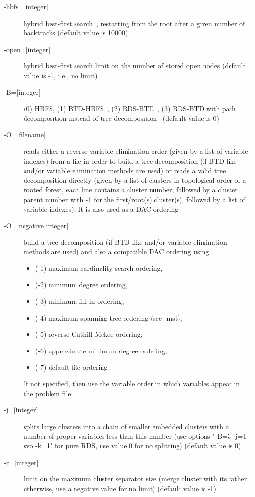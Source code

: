\documentclass{article}
\begin{document}
\begin{description}
\item[{-hbfs=[integer]}] hybrid best-first search~\cite{Katsirelos15a}, restarting from the
  root after a given number of backtracks (default value is 10000)
\item[{-open=[integer]}] hybrid best-first search limit on the number
  of stored open nodes (default value is -1, i.e., no limit)
\item[{-B=[integer]}] (0) HBFS, (1) BTD-HBFS~\cite{Schiex06a,Katsirelos15a}, (2) RDS-BTD~\cite{Sanchez09a}, (3) RDS-BTD with
  path decomposition instead of tree decomposition~\cite{Sanchez09a} (default value is
  0)
\item[{-O=[filename]}] reads either a reverse variable elimination order (given by a list of variable indexes) from a file
  in order to build a tree decomposition (if BTD-like and/or variable
  elimination methods are used) or reads a valid tree decomposition directly (given by a list of clusters in topological order of a rooted forest, each line contains a cluster number, followed by a cluster parent number with -1 for the first/root(s) cluster(s), followed by a list of variable indexes). It is also used as a DAC ordering.
\item[{-O=[negative integer]}] build a tree decomposition (if BTD-like
  and/or variable elimination methods are used) and also a compatible
  DAC ordering using
  \begin{itemize}
    \item (-1) maximum cardinality search ordering, 
    \item (-2) minimum degree ordering, 
    \item (-3) minimum fill-in ordering,
    \item (-4) maximum spanning tree ordering (see -mst), 
    \item (-5) reverse Cuthill-Mckee ordering, 
    \item (-6) approximate minimum degree ordering,
    \item (-7) default file ordering
    \end{itemize}
    If not specified, then use the variable order in which variables appear in the problem file.
\item[{-j=[integer]}] splits large clusters into a chain of smaller embedded clusters with a number of proper variables less than this number (use options "-B=3 -j=1 -svo -k=1" for pure RDS, use value 0 for no splitting) (default value is 0).
\item[{-r=[integer]}] limit on the maximum cluster separator size (merge cluster with its father otherwise, use a negative value for no limit) (default value is -1)

\end{description}
\end{document}
